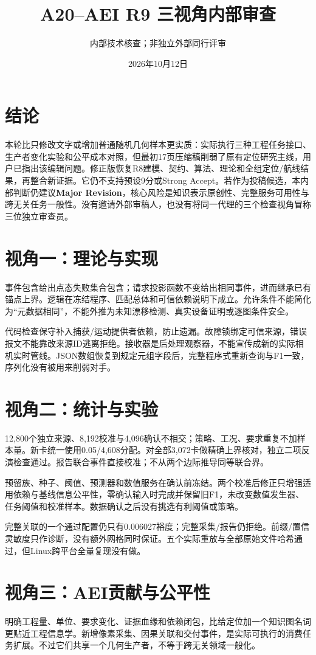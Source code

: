 \documentclass[UTF8,a4paper,11pt,fontset=fandol]{ctexart}
\title{A20--AEI R9 三视角内部审查}
\author{内部技术核查；非独立外部同行评审}\date{2026年10月12日}
\begin{document}
\maketitle
\section{结论}
本轮比只修改文字或增加普通随机几何样本更实质：实际执行三种工程任务接口、生产者变化实验和公平成本对照，但最初17页压缩稿削弱了原有定位研究主线，用户已指出该编辑问题。修正版恢复R8建模、契约、算法、理论和全组定位/航线结果，再整合新证据。它仍不支持预设9分或Strong Accept。若作为投稿候选，本内部判断仍建议\textbf{Major Revision}，核心风险是知识表示原创性、完整服务可用性与跨无关任务一般性。没有邀请外部审稿人，也没有将同一代理的三个检查视角冒称三位独立审查员。

\section{视角一：理论与实现}
事件包含给出点态失败集合包含；请求投影函数不变给出相同事件，进而继承已有锚点上界。逻辑在冻结程序、匹配总体和可信依赖说明下成立。允许条件不能简化为“元数据相同”，不能外推为未知漂移检测、真实设备证明或逐图条件安全。

代码检查保守补入捕获/运动提供者依赖，防止遗漏。故障锁绑定可信来源，错误报文不能靠改来源ID逃离拒绝。接收器是后处理观察器，不能宣传成新的实际相机实时管线。JSON数组恢复到规定元组字段后，完整程序式重新查询与F1一致，序列化没有被用来削弱对手。

\section{视角二：统计与实验}
12,800个独立来源、8,192校准与4,096确认不相交；策略、工况、要求重复不加样本量。新卡统一使用0.05/4,608分配。对全部3,072卡做精确上界核对，独立二项反演检查通过。报告联合事件直接校准；不从两个边际推导同等联合界。

预留族、种子、阈值、预测器和数值服务在确认前冻结。两个校准后修正只增强适用依赖与基线信息公平性，零确认输入时完成并保留旧F1，未改变数值发生器、任务阈值和校准样本。数据确认之后没有挑选有利阈值或策略。

完整关联的一个通过配置仍只有0.006027裕度；完整采集/报告仍拒绝。前缀/置信灵敏度只作诊断，没有额外网格同时保证。五个实际重放与全部原始文件哈希通过，但Linux跨平台全量复现没有做。

\section{视角三：AEI贡献与公平性}
明确工程量、单位、要求变化、证据血缘和依赖闭包，比给定位加一个知识图名词更贴近工程信息学。新增像素采集、因果关联和交付事件，是实际可执行的消费任务扩展。不过它们共享一个几何生产者，不等于跨无关领域一般化。
\end{document}
